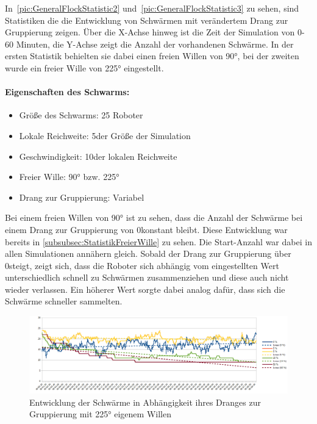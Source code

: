 In~\autoref{pic:GeneralFlockStatistic2} und~\autoref{pic:GeneralFlockStatistic3} zu sehen, sind Statistiken die die Entwicklung von Schwärmen mit verändertem Drang zur Gruppierung zeigen. Über die X-Achse hinweg ist die Zeit der Simulation von 0-60 Minuten, die Y-Achse zeigt die Anzahl der vorhandenen Schwärme. In der ersten Statistik behielten sie dabei einen freien Willen von 90°, bei der zweiten wurde ein freier Wille von 225° eingestellt.

\paragraph*{Eigenschaften des Schwarms:}
\begin{itemize}
	\item Größe des Schwarms: 25 Roboter
	\item Lokale Reichweite: 5\per der Größe der Simulation
	\item Geschwindigkeit: 10\per der lokalen Reichweite
	\item Freier Wille: 90° bzw. 225°
	\item Drang zur Gruppierung: Variabel
\end{itemize}

Bei einem freien Willen von 90° ist zu sehen, dass die Anzahl der Schwärme bei einem Drang zur Gruppierung von 0\per konstant bleibt. Diese Entwicklung war bereits in \autoref{subsubsec:StatistikFreierWille} zu sehen. Die Start-Anzahl war dabei in allen Simulationen annähern gleich.
Sobald der Drang zur Gruppierung über 0\per steigt, zeigt sich, dass die Roboter sich abhängig vom eingestellten Wert unterschiedlich schnell zu Schwärmen zusammenziehen und diese auch nicht wieder verlassen. Ein höherer Wert sorgte dabei analog dafür, dass sich die Schwärme schneller sammelten.

\begin{figure}
	\includegraphics[width=\textwidth, height=\statisticHeight]{graphics/Statistics/FlockGeneral/LocalRange1Speed01FreeWill225.png}
	\caption{Entwicklung der Schwärme in Abhängigkeit ihres Dranges zur Gruppierung mit 225° eigenem Willen}
	\label{pic:GeneralFlockStatistic3}
\end{figure}

